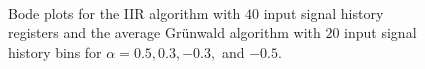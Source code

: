 \begin{figure}[ht!]
\begin{center}
\\
\end{center}
\label{fig:bode20}
\caption{Bode plots for the IIR algorithm with $40$ input signal history registers
  and the average Gr{\"u}nwald algorithm with $20$ input signal history
  bins for $\alpha=0.5, 0.3, -0.3,$ and $-0.5$. }

\end{figure}
